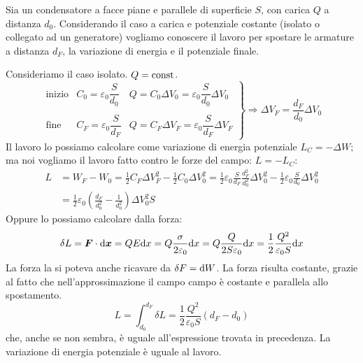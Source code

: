 \begin{Es}
Sia un condensatore a facce piane e parallele di superficie $S$, con carica $Q$ a distanza $d_0$. Considerando il caso a carica e potenziale costante (isolato o collegato ad un generatore) vogliamo conoscere il lavoro per spostare le armature a distanza $d_F$, la variazione di energia e il potenziale finale.

Consideriamo il caso isolato. $Q=\text{const}$.
\begin{equation*}
\left.
\begin{array}{lcl}
\text{inizio}&C_0=\varepsilon_0\dfrac{S}{d_0}&Q=C_0\Delta V_0=\varepsilon_0\dfrac{S}{d_0}\Delta V_0\\
\\
\text{fine}&C_F=\varepsilon_0\dfrac{S}{d_F}&Q=C_F\Delta V_F=\varepsilon_0\dfrac{S}{d_F}\Delta V_F
\end{array}\right\}
\Rightarrow
\Delta V_F=\frac{d_F}{d_0}\Delta V_0
\end{equation*}
Il lavoro lo possiamo calcolare come variazione di energia potenziale $L_C=-\Delta W$; ma noi vogliamo il lavoro fatto contro le forze del campo: $L=-L_C$:
\begin{align*}
L&=W_F-W_0=\frac{1}{2}C_F\Delta V_F^2-\frac{1}{2}C_0\Delta V_0^2=\frac{1}{2}\varepsilon_0\frac{S}{d_F}\frac{d_F^2}{d_0^2}\Delta V_0^2-\frac{1}{2}\varepsilon_0\frac{S}{d_0}\Delta V_0^2\\
&=\frac{1}{2}\varepsilon_0\left(\frac{d_F}{d_0^2}-\frac{1}{d_0^2}\right)\Delta V_0^2 S
\end{align*}
Oppure lo possiamo calcolare dalla forza:
\begin{equation*}\delta L=\boldsymbol{F}\cdot\mathrm{d} \boldsymbol{x}=QE\mathrm{d} x=Q\frac{\sigma}{2\varepsilon_0}\mathrm{d} x=Q\frac{Q}{2S\varepsilon_0}\mathrm{d} x=\frac{1}{2}\frac{Q^2}{\varepsilon_0 S}\mathrm{d} x\end{equation*}
La forza la si poteva anche ricavare da $\delta F=\mathrm{d} W$. La forza risulta costante, grazie al fatto che nell'approssimazione il campo campo è costante e parallela allo spostamento.
\begin{equation*}L=\int_{d_0}^{d_F}\delta L=\frac{1}{2}\frac{Q^2}{\varepsilon_0 S}(d_F-d_0)\end{equation*}
che, anche se non sembra, è uguale all'espressione trovata in precedenza. La variazione di energia potenziale è uguale al lavoro.


\end{Es}
